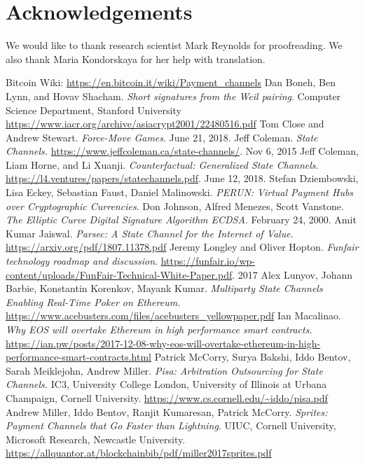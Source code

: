 \documentclass[tikz, 12pt]{article}
\theoremstyle{definition}
\theoremstyle{remark}
\begin{document}
\section*{Acknowledgements}
We would like to thank research scientist Mark Reynolds for proofreading. We also thank Maria Kondorskaya for her help with translation. 
	\begin{thebibliography}{9}
 Bitcoin Wiki: \url{https://en.bitcoin.it/wiki/Payment_channels}
 Dan Boneh, Ben Lynn, and Hovav Shacham. \emph{Short signatures from the Weil pairing}. Computer Science Department, Stanford University \url{https://www.iacr.org/archive/asiacrypt2001/22480516.pdf}
 Tom Close and Andrew Stewart. \emph{Force-Move Games}. June 21, 2018.
 Jeff Coleman. \emph{State Channels.} \url{https://www.jeffcoleman.ca/state-channels/}. Nov 6, 2015
 Jeff Coleman, Liam Horne, and Li Xuanji. \emph{Counterfactual: Generalized State Channels}. \url{https://l4.ventures/papers/statechannels.pdf}. June 12, 2018.
 Stefan Dziembowski, Lisa Eckey, Sebastian Faust, Daniel Malinowski. \emph{PERUN: Virtual Payment Hubs over Cryptographic Currencies}.
 Don Johnson, Alfred Menezes, Scott Vanstone. \emph{The Elliptic Curve Digital Signature Algorithm ECDSA}. February 24, 2000.
 Amit Kumar Jaiswal. \emph{Parsec: A State Channel for the Internet of Value.} \url{https://arxiv.org/pdf/1807.11378.pdf}
 Jeremy Longley and Oliver Hopton. \emph{Funfair technology roadmap and discussion}. \url{https://funfair.io/wp-content/uploads/FunFair-Technical-White-Paper.pdf}. 2017
 Alex Lunyov, Johann Barbie, Konstantin Korenkov, Mayank Kumar. \emph{Multiparty State Channels Enabling Real-Time Poker on Ethereum}. \url{https://www.acebusters.com/files/acebusters_yellowpaper.pdf}
 Ian Macalinao. \emph{Why EOS will overtake Ethereum in high performance smart contracts}. \url{https://ian.pw/posts/2017-12-08-why-eos-will-overtake-ethereum-in-high-performance-smart-contracts.html}
 Patrick McCorry, Surya Bakshi, Iddo Bentov, Sarah Meiklejohn, Andrew Miller. \emph{Pisa: Arbitration Outsourcing for State Channels.} IC3, University College London, University of Illinois at Urbana Champaign, Cornell University. \url{https://www.cs.cornell.edu/~iddo/pisa.pdf}
 Andrew Miller, Iddo Bentov, Ranjit Kumaresan, Patrick McCorry. \emph{Sprites: Payment Channels that Go Faster than Lightning}. UIUC, Cornell University, Microsoft Research, Newcastle University. \url{https://allquantor.at/blockchainbib/pdf/miller2017sprites.pdf}

\end{thebibliography}
\end{document}
